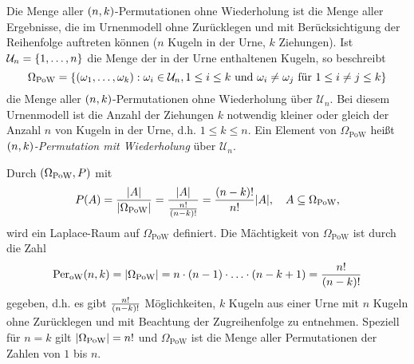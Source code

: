 \documentclass{lecture}
\begin{document}
    \begin{definition}
        Die Menge aller \(\parentheses*{n, k}\)-Permutationen ohne Wiederholung ist die Menge aller Ergebnisse, die im Urnenmodell ohne Zurücklegen und mit Berücksichtigung der Reihenfolge auftreten können (\(n\) Kugeln in der Urne, \(k\) Ziehungen).
        Ist \(\mathcal{U}_n = \braces*{1, \ldots, n}\) die Menge der in der Urne enthaltenen Kugeln, so beschreibt
        \[
            \Omega_{\text{PoW}} = \braces*{\parentheses*{\omega_1, \ldots, \omega_k} : \omega_i \in \mathcal{U}_n, 1 \le i \le k\text{ und }\omega_i \ne \omega_j\text{ für }1 \le i \ne j \le k}
        \]
        die Menge aller \(\parentheses*{n, k}\)-Permutationen ohne Wiederholung über \(\mathcal{U}_n\).
        Bei diesem Urnenmodell ist die Anzahl der Ziehungen \(k\) notwendig kleiner oder gleich der Anzahl \(n\) von Kugeln in der Urne, d.h. \(1 \le k \le n\).
        Ein Element von \(\Omega_{\text{PoW}}\) heißt \emph{\(\parentheses*{n, k}\)-Permutation mit Wiederholung} über \(\mathcal{U}_n\).
    \end{definition}

    Durch \(\parentheses*{\Omega_{\text{PoW}}, P}\) mit
    \[
        P\parentheses*{A} = \frac{\absolute*{A}}{\absolute*{\Omega_{\text{PoW}}}} = \frac{\absolute*{A}}{\frac{n!}{\parentheses*{n - k}!}} = \frac{\parentheses*{n - k}!}{n!}\absolute*{A}, \quad A \subseteq \Omega_{\text{PoW}},
    \]
    wird ein Laplace-Raum auf \(\Omega_{\text{PoW}}\) definiert.
    Die Mächtigkeit von \(\Omega_{\text{PoW}}\) ist durch die Zahl
    \[
        \Per_{\text{oW}}\parentheses*{n, k} = \absolute*{\Omega_{\text{PoW}}} = n \cdot \parentheses*{n - 1} \cdot \ldots \cdot \parentheses*{n - k + 1} = \frac{n!}{\parentheses*{n - k}!}
    \]
    gegeben, d.h. es gibt \(\frac{n!}{\parentheses*{n - k}!}\) Möglichkeiten, \(k\) Kugeln aus einer Urne mit \(n\) Kugeln ohne Zurücklegen und mit Beachtung der Zugreihenfolge zu entnehmen.
    Speziell für \(n = k\) gilt \(\absolute*{\Omega_{\text{PoW}}} = n!\) und \(\Omega_{\text{PoW}}\) ist die Menge aller Permutationen der Zahlen von \(1\) bis \(n\).
\end{document}
